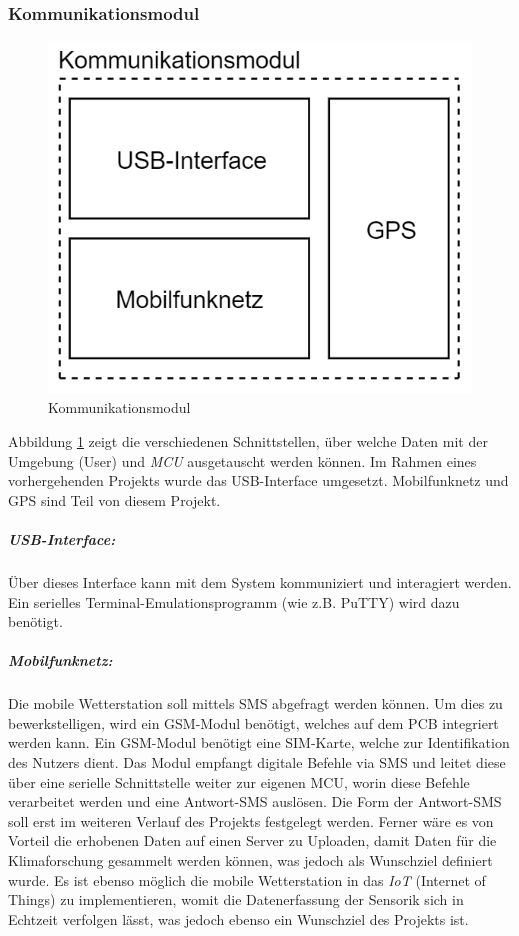 \subsubsection{Kommunikationsmodul}
\begin{figure}[h]
\centering
\includegraphics[scale=0.7]{graphics/Konzeptdiagramme/Kommunikationsmodul.PNG}
\caption{Kommunikationsmodul}
\label{fig:kommunikationsmodul}
\end{figure}
Abbildung \ref{fig:kommunikationsmodul} zeigt die verschiedenen Schnittstellen, über welche Daten mit der Umgebung (User) und \textit{MCU} ausgetauscht werden können. Im Rahmen eines vorhergehenden Projekts wurde das USB-Interface umgesetzt. Mobilfunknetz und GPS sind Teil von diesem Projekt.\\

\subparagraph{USB-Interface:}
Über dieses Interface kann mit dem System kommuniziert und interagiert werden. Ein serielles Terminal-Emulationsprogramm (wie z.B. PuTTY) wird dazu benötigt.\\

\subparagraph{Mobilfunknetz:}
Die mobile Wetterstation soll mittels SMS abgefragt werden können. Um dies zu bewerkstelligen, wird ein GSM-Modul benötigt, welches auf dem PCB integriert werden kann. Ein GSM-Modul benötigt eine SIM-Karte, welche zur Identifikation des Nutzers dient. Das Modul empfangt digitale Befehle via SMS und leitet diese über eine serielle Schnittstelle weiter zur eigenen MCU, worin diese Befehle verarbeitet werden und eine Antwort-SMS auslösen. Die Form der Antwort-SMS soll erst im weiteren Verlauf des Projekts festgelegt werden. Ferner wäre es von Vorteil die erhobenen Daten auf einen Server zu Uploaden, damit Daten für die Klimaforschung gesammelt werden können, was jedoch als Wunschziel definiert wurde. Es ist ebenso möglich die mobile Wetterstation in das \textit{IoT} (Internet of Things) zu implementieren, womit die Datenerfassung der Sensorik sich in Echtzeit verfolgen lässt, was jedoch ebenso ein Wunschziel des Projekts ist. \\

